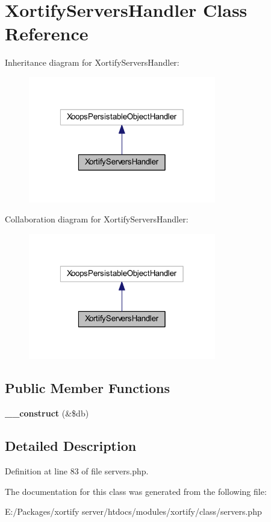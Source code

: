 \hypertarget{class_xortify_servers_handler}{\section{Xortify\-Servers\-Handler Class Reference}
\label{class_xortify_servers_handler}
}


Inheritance diagram for Xortify\-Servers\-Handler\-:
\nopagebreak
\begin{figure}[H]
\begin{center}
\leavevmode
\includegraphics[width=232pt]{class_xortify_servers_handler__inherit__graph}
\end{center}
\end{figure}


Collaboration diagram for Xortify\-Servers\-Handler\-:
\nopagebreak
\begin{figure}[H]
\begin{center}
\leavevmode
\includegraphics[width=232pt]{class_xortify_servers_handler__coll__graph}
\end{center}
\end{figure}
\subsection*{Public Member Functions}
\begin{DoxyCompactItemize}
\item 
\hypertarget{class_xortify_servers_handler_aaf2ef772755ec6f361d44e16cc9ffd69}{{\bfseries \-\_\-\-\_\-construct} (\&\$db)}\label{class_xortify_servers_handler_aaf2ef772755ec6f361d44e16cc9ffd69}

\end{DoxyCompactItemize}


\subsection{Detailed Description}


Definition at line 83 of file servers.\-php.



The documentation for this class was generated from the following file\-:\begin{DoxyCompactItemize}
\item 
E\-:/\-Packages/xortify server/htdocs/modules/xortify/class/servers.\-php\end{DoxyCompactItemize}
